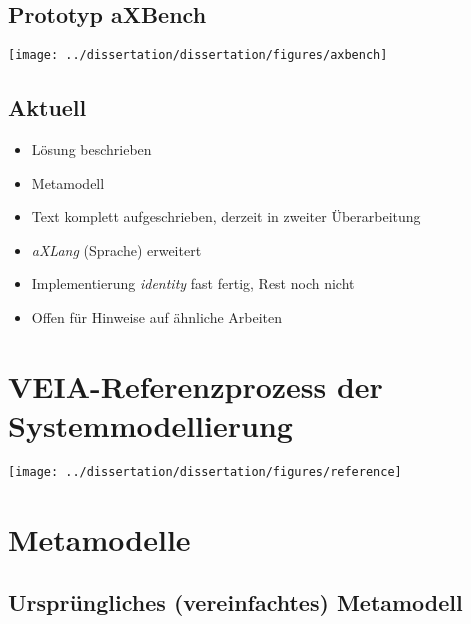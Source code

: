 	\subsection{Prototyp aXBench}

	\begin{frame}{\insertsectionhead}{\insertsubsectionhead}
		\hfil\texttt{[image: ../dissertation/dissertation/figures/axbench]}\hfil
	\end{frame}

	\subsection{Aktuell}

	\begin{frame}{\insertsectionhead}{\insertsubsectionhead}
		\begin{itemize}
			\item Lösung beschrieben
			\item Metamodell
			\item Text komplett aufgeschrieben, derzeit in zweiter Überarbeitung
			\item \textit{aXLang} (Sprache) erweitert
			\item Implementierung \textit{identity} fast fertig, Rest noch nicht
			\item Offen für Hinweise auf ähnliche Arbeiten
		\end{itemize}
	\end{frame}
	
	\setcounter{finalframe}{\value{framenumber}}

	\appendix
	
	\section{VEIA-Referenzprozess der Systemmodellierung}

	\begin{frame}{\insertsectionhead}
		\hfil\texttt{[image: ../dissertation/dissertation/figures/reference]}\hfil
	\end{frame}

	\section{Metamodelle}

	\subsection{Ursprüngliches (vereinfachtes) Metamodell}

